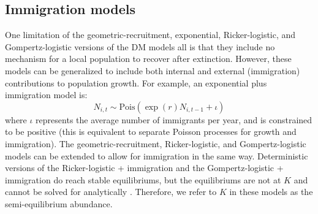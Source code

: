 \documentclass[12pt]{article}
\begin{document}
\subsection{Immigration models}

One limitation of the geometric-recruitment, exponential,
Ricker-logistic, and Gompertz-logistic versions of the DM models all
is that they include no mechanism for a local population to recover
after extinction. %
However, these models can be generalized 
to include both internal and external (immigration) contributions
to population growth. For example, an exponential plus immigration
model is:
\begin{equation}
  N_{i,t} \sim \mathrm{Pois}(\exp(r)N_{i,t-1} + \iota)
  \label{eq:expimm2}
\end{equation}
where $\iota$ represents the average number of immigrants per year, and is
constrained to be
positive (this is equivalent to separate Poisson processes for
growth and immigration).  %
The geometric-recruitment, Ricker-logistic,
and Gompertz-logistic models can be extended to allow for immigration in the
same way.   Deterministic versions of the Ricker-logistic + immigration and the 
Gompertz-logistic + immigration do reach stable equilibriums, but the equilibriums 
are not at $K$ and cannot be solved for analytically \citep{otto_day:2007}.  Therefore, we
refer to $K$ in these models as the semi-equilibrium abundance.

\end{document}
